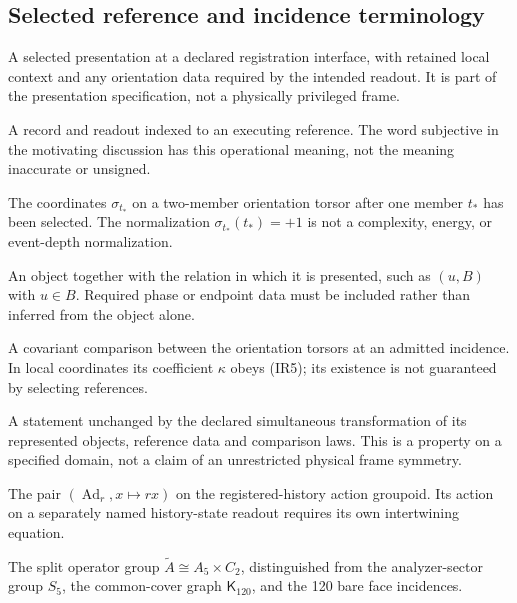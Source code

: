 \subsection*{Selected reference and incidence terminology}
\begin{description}[style=nextline]
\item[Executing reference.] A selected presentation at a declared registration interface, with retained local context and any orientation data required by the intended readout. It is part of the presentation specification, not a physically privileged frame.
\item[Situated account.] A record and readout indexed to an executing reference. The word subjective in the motivating discussion has this operational meaning, not the meaning inaccurate or unsigned.
\item[Reference signing.] The coordinates $\sigma_{t_*}$ on a two-member orientation torsor after one member $t_*$ has been selected. The normalization $\sigma_{t_*}(t_*)=+1$ is not a complexity, energy, or event-depth normalization.
\item[Incidence presentation.] An object together with the relation in which it is presented, such as $(u,B)$ with $u\in B$. Required phase or endpoint data must be included rather than inferred from the object alone.
\item[Orientation reconciliation.] A covariant comparison between the orientation torsors at an admitted incidence. In local coordinates its coefficient $\kappa$ obeys (IR5); its existence is not guaranteed by selecting references.
\item[Reference-independent statement.] A statement unchanged by the declared simultaneous transformation of its represented objects, reference data and comparison laws. This is a property on a specified domain, not a claim of an unrestricted physical frame symmetry.
\item[Phase-transport automorphism.] The pair $(\operatorname{Ad}_r,x\mapsto rx)$ on the registered-history action groupoid. Its action on a separately named history-state readout requires its own intertwining equation.
\item[Signed-axis extension.] The split operator group $\widetilde A\cong A_5\times C_2$, distinguished from the analyzer-sector group $S_5$, the common-cover graph $\mathsf K_{120}$, and the 120 bare face incidences.
\end{description}
